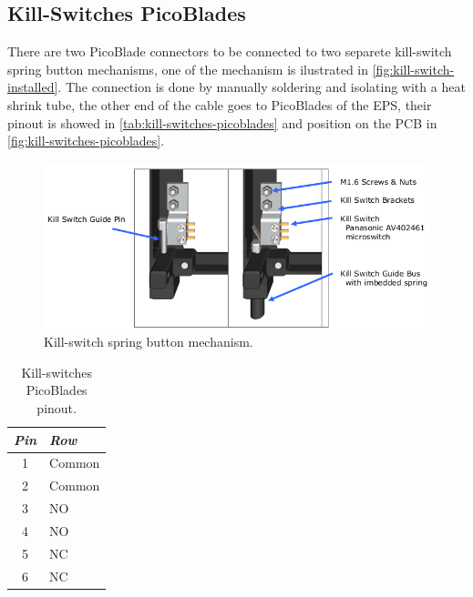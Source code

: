 \subsection{Kill-Switches PicoBlades} \label{kill-switches-picoblades}

There are two PicoBlade connectors to be connected to two separete kill-switch spring button mechanisms, one of the mechanism is ilustrated in \autoref{fig:kill-switch-installed}. The connection is done by manually soldering and isolating with a heat shrink tube, the other end of the cable goes to PicoBlades of the EPS, their pinout is showed in \autoref{tab:kill-switches-picoblades} and position on the PCB in \autoref{fig:kill-switches-picoblades}.

\begin{figure}[!ht]
    \begin{center}
        \includegraphics[width=\textwidth]{figures/kill-switch-installed.png}
        \caption{Kill-switch spring button mechanism.}
        \label{fig:kill-switch-installed}
    \end{center}
\end{figure}

\begin{table}[!h]
    \centering
    \begin{tabular}{cl}
        \toprule[1.5pt]
        \textit{Pin} & \textit{Row} \\
        \midrule
        1            & Common \\
        2            & Common \\
        3            & NO\nomenclature{\textbf{NO}}{\textit{Normally open.}} \\
        4            & NO\nomenclature{\textbf{NO}}{\textit{Normally open.}} \\
        5            & NC\nomenclature{\textbf{NC}}{\textit{Normally closed.}} \\
        6            & NC\nomenclature{\textbf{NC}}{\textit{Normally closed.}} \\
        \bottomrule[1.5pt]
    \end{tabular}
    \caption{Kill-switches PicoBlades pinout.}
    \label{tab:kill-switches-picoblades}
\end{table}


